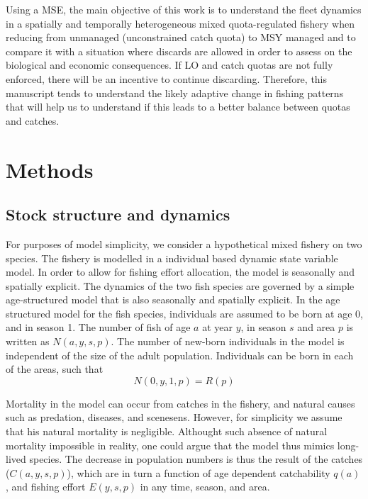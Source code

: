 \documentclass[12pt,oneline,a4paper,numbib]{ouparticle}
\begin{document}
Using a MSE, the main objective of this work is to understand the fleet dynamics in a spatially and temporally heterogeneous mixed quota-regulated fishery when reducing from unmanaged (unconstrained catch quota) to MSY managed and to compare it with a situation where discards are allowed in order to assess on the biological and economic consequences. If LO and catch quotas are not fully enforced, there will be an incentive to continue discarding. Therefore, this manuscript tends to understand the likely adaptive change in fishing patterns that will help us to understand if this leads to a better balance between quotas and catches.



\section{Methods}
\label{sec2}

\subsection{Stock structure and dynamics}
\label{sec2.1}

For purposes of model simplicity, we consider a hypothetical mixed fishery on two species. The fishery is modelled in a individual based dynamic state variable model. In order to allow for fishing effort allocation, the model is seasonally and spatially explicit. The dynamics of the two fish species are governed by a simple age-structured model that is also seasonally and spatially explicit. In the age structured model for the fish species, individuals are assumed to be born at age 0, and in season 1. The number of fish of age $a$ at year $y$, in season $s$ and area $p$ is written as $N (a, y, s, p)$. The number of new-born individuals in the model is independent of the size of the adult population. Individuals can be born in each of the areas, such that  
\begin{equation*}
N (0, y, 1, p) = R (p)
\end{equation*}

Mortality in the model can occur from catches in the fishery, and natural causes such as predation, diseases, and scenesens. However, for simplicity we assume that his natural mortality is negligible. Althought such absence of natural mortality impossible in reality, one could argue that the model thus mimics long-lived species. The decrease in population numbers is thus the result of the catches ($C (a, y, s, p)$), which are in turn a function of age dependent catchability $q(a)$, and fishing effort $E (y,s,p)$ in any time, season, and area. 
\end{document}
